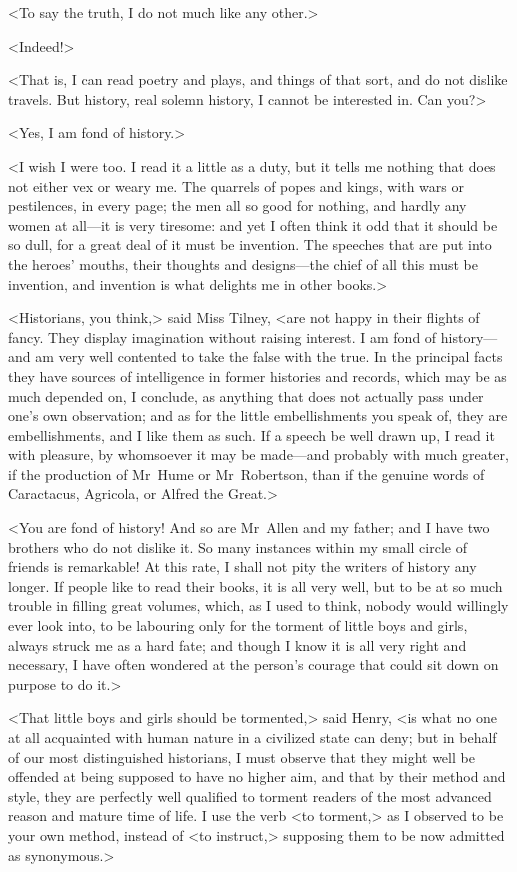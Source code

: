  <To say the truth, I do not much like any other.> 

 <Indeed!> 

 <That is, I can read poetry and plays, and things of that sort, and do not dislike travels. But history, real solemn history, I cannot be interested in. Can you?> 

 <Yes, I am fond of history.> 

 <I wish I were too. I read it a little as a duty, but it tells me nothing that does not either vex or weary me. The quarrels of popes and kings, with wars or pestilences, in every page; the men all so good for nothing, and hardly any women at all—it is very tiresome: and yet I often think it odd that it should be so dull, for a great deal of it must be invention. The speeches that are put into the heroes' mouths, their thoughts and designs—the chief of all this must be invention, and invention is what delights me in other books.> 

 <Historians, you think,> said Miss Tilney, <are not happy in their flights of fancy. They display imagination without raising interest. I am fond of history—and am very well contented to take the false with the true. In the principal facts they have sources of intelligence in former histories and records, which may be as much depended on, I conclude, as anything that does not actually pass under one's own observation; and as for the little embellishments you speak of, they are embellishments, and I like them as such. If a speech be well drawn up, I read it with pleasure, by whomsoever it may be made—and probably with much greater, if the production of Mr~Hume or Mr~Robertson, than if the genuine words of Caractacus, Agricola, or Alfred the Great.> 

 <You are fond of history! And so are Mr~Allen and my father; and I have two brothers who do not dislike it. So many instances within my small circle of friends is remarkable! At this rate, I shall not pity the writers of history any longer. If people like to read their books, it is all very well, but to be at so much trouble in filling great volumes, which, as I used to think, nobody would willingly ever look into, to be labouring only for the torment of little boys and girls, always struck me as a hard fate; and though I know it is all very right and necessary, I have often wondered at the person's courage that could sit down on purpose to do it.> 

 <That little boys and girls should be tormented,> said Henry, <is what no one at all acquainted with human nature in a civilized state can deny; but in behalf of our most distinguished historians, I must observe that they might well be offended at being supposed to have no higher aim, and that by their method and style, they are perfectly well qualified to torment readers of the most advanced reason and mature time of life. I use the verb <to torment,> as I observed to be your own method, instead of <to instruct,> supposing them to be now admitted as synonymous.> 

